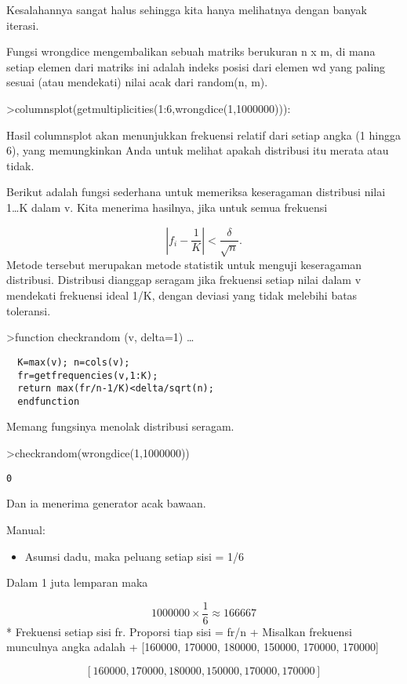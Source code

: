 \documentclass[
]{book}
\providecommand{\tightlist}{%
  \setlength{\itemsep}{0pt}\setlength{\parskip}{0pt}}
\begin{document}
Kesalahannya sangat halus sehingga kita hanya melihatnya dengan banyak iterasi.

Fungsi wrongdice mengembalikan sebuah matriks berukuran n x m, di mana setiap elemen dari matriks ini adalah indeks posisi dari elemen wd yang paling sesuai (atau mendekati) nilai acak dari random(n, m).

\textgreater columnsplot(getmultiplicities(1:6,wrongdice(1,1000000))):

Hasil columnsplot akan menunjukkan frekuensi relatif dari setiap angka (1 hingga 6), yang memungkinkan Anda untuk melihat apakah distribusi itu merata atau tidak.

Berikut adalah fungsi sederhana untuk memeriksa keseragaman distribusi nilai 1\ldots K dalam v. Kita menerima hasilnya, jika untuk semua frekuensi

\[\left|f_i-\frac{1}{K}\right| < \frac{\delta}{\sqrt{n}}.\]Metode tersebut merupakan metode statistik untuk menguji keseragaman distribusi. Distribusi dianggap seragam jika frekuensi setiap nilai dalam v mendekati frekuensi ideal 1/K, dengan deviasi yang tidak melebihi batas toleransi.

\textgreater function checkrandom (v, delta=1) \ldots{}

\begin{verbatim}
  K=max(v); n=cols(v);
  fr=getfrequencies(v,1:K);
  return max(fr/n-1/K)<delta/sqrt(n);
  endfunction
\end{verbatim}

Memang fungsinya menolak distribusi seragam.

\textgreater checkrandom(wrongdice(1,1000000))

\begin{verbatim}
0
\end{verbatim}

Dan ia menerima generator acak bawaan.

Manual:

\begin{itemize}
\tightlist
\item
  Asumsi dadu, maka peluang setiap sisi = 1/6
\end{itemize}

Dalam 1 juta lemparan maka

\[1000000 \times \frac{1}{6} \approx 166667\]* Frekuensi setiap sisi fr. Proporsi tiap sisi = fr/n + Misalkan frekuensi munculnya angka adalah + {[}160000, 170000, 180000, 150000, 170000, 170000{]}

\[[160000, 170000, 180000, 150000, 170000, 170000]\]
\end{document}
